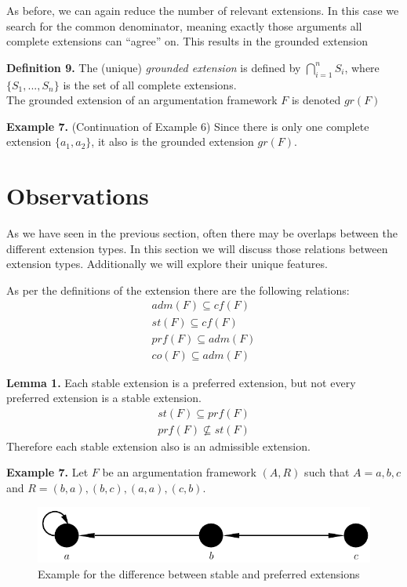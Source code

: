 \documentclass[draft,final]{vutinfth} %
\newcommand{\cl}{\par\vspace{12pt}} %
\newcommand{\dl}{\par\vspace{24pt}} %
\begin{document}
As before, we can again reduce the number of relevant extensions. In this case we search for the common denominator, meaning exactly those arguments all complete extensions can ``agree'' on. This results in the grounded extension\cl

\textbf{Definition 9.} The (unique) \emph{grounded extension} is defined by $\bigcap\limits_{i=1}^n{S_i}$, where $\{S_1,...,S_n\}$ is the set of all complete extensions.\\
The grounded extension of an argumentation framework $F$ is denoted $gr(F)$\cl

\textbf{Example 7.} (Continuation of Example 6) Since there is only one complete extension $\{a_1,a_2\}$, it also is the grounded extension $gr(F)$.\dl

\chapter{Observations}

As we have seen in the previous section, often there may be overlaps between the different extension types. In this section we will discuss those relations between extension types. Additionally we will explore their unique features.\dl

As per the definitions of the extension there are the following relations:
\begin{align} %
	adm(F)\subseteq cf(F)\\
	st(F)\subseteq cf(F)\\
	prf(F)\subseteq adm(F)\\
	co(F)\subseteq adm(F)
\end{align}\dl

\textbf{Lemma 1.} %
Each stable extension is a preferred extension, but not every preferred extension is a stable extension.\\
\begin{align}
	st(F)\subseteq prf(F)\\
	prf(F)\not\subseteq st(F)
\end{align}
Therefore each stable extension also is an admissible extension.\cl

\textbf{Example 7.} Let $F$ be an argumentation framework $(A,R)$ such that $A={a,b,c}$ and $R={(b,a),(b,c),(a,a),(c,b)}$.

\FloatBarrier
	\begin{figure}[!htb]
		\centering
		\includegraphics[width=\linewidth]{graphs/ex2.pdf}
		\caption{Example for the difference between stable and preferred extensions}
	\end{figure}
\FloatBarrier
\end{document}
